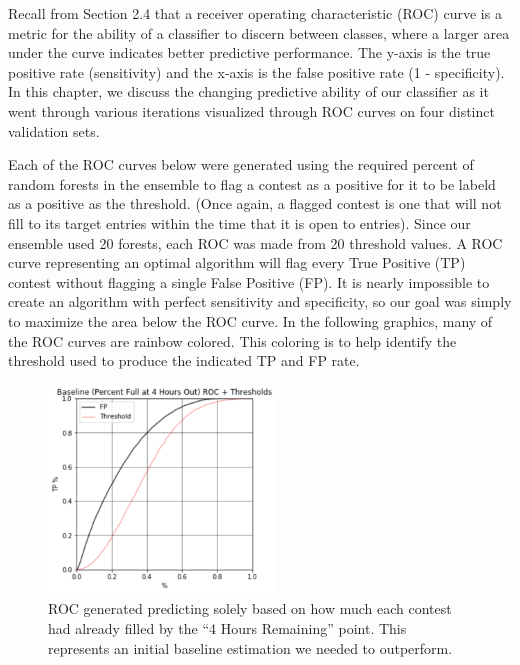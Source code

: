 Recall from Section 2.4 that a receiver operating characteristic (ROC) curve is a metric for the ability of a classifier to discern between classes, where a larger area under the curve indicates better predictive performance. The y-axis is the true positive rate (sensitivity) and the x-axis is the false positive rate (1 - specificity). In this chapter, we discuss the changing predictive ability of our classifier as it went through various iterations visualized through ROC curves on four distinct validation sets.

Each of the ROC curves below were generated using the required percent of random forests in the ensemble to flag a contest as a positive for it to be labeld as a positive as the threshold. (Once again, a flagged contest is one that will not fill to its target entries within the time that it is open to entries). Since our ensemble used 20 forests, each ROC was made from 20 threshold values. A ROC curve representing an optimal algorithm will flag every True Positive (TP) contest without flagging a single False Positive (FP). It is nearly impossible to create an algorithm with perfect sensitivity and specificity, so our goal was simply to maximize the area below the ROC curve. 
In the following graphics, many of the ROC curves are rainbow colored. This coloring is to help identify the threshold used to produce the indicated TP and FP rate.

\begin{figure}[h]
\centering
\includegraphics[width=6cm]{body/results/baseline.png}
\caption{ROC generated predicting solely based on how much each contest had already filled by the ``4 Hours Remaining'' point. This represents an initial baseline estimation we needed to outperform.}
\label{fig:baseline}
\end{figure}

